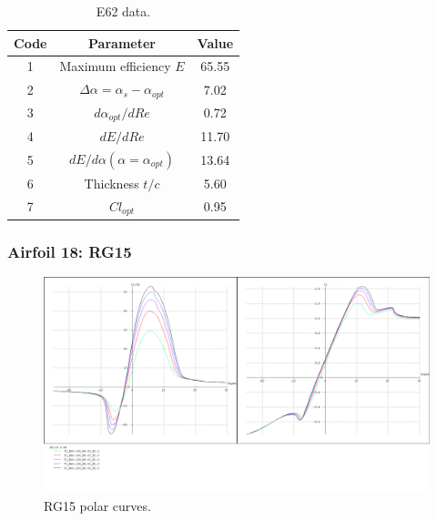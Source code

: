 \documentclass[../TFG_Annex.tex]{subfiles}
\begin{document}
\begin{table}[h!]
	\centering
	\begin{tabular}{c|c|c}
		Code & Parameter                                    & Value  \\ \hline
		1    & Maximum efficiency $E$                      &  65.55   \\
		2    & $\Delta \alpha=\alpha_{s}-\alpha_{opt}$    &        7.02         \\
		3    & ${d\alpha_{opt}}/{dRe}$                     &           0.72     \\
		4    & ${dE}/{dRe}$                                &        11.70     \\
		5    & ${dE}/{d \alpha} (\alpha=\alpha_{opt})$      &           13.64        \\
		6    & Thickness $t/c$                            &              5.60      \\
		7    & $Cl_{opt}$  &   0.95
	\end{tabular}
	\caption{E62 data.}
	\label{tab:Airf17}
\end{table}



\newpage
\subsubsection{Airfoil 18: RG15}



\begin{figure}[h!]
	\centering
	\includegraphics[width=1\linewidth]{"../../04-Airfoil selection/Imatges airfoils/18-RG15"}
	\caption{RG15 polar curves.}
	\label{fig:18-RG15}
\end{figure}
\end{document}
